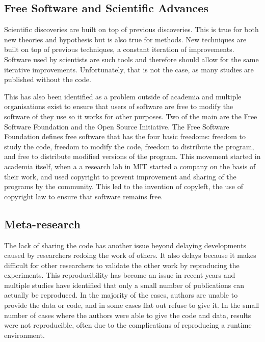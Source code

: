   \subsection{Free Software and Scientific Advances}
  Scientific discoveries are built on top of previous discoveries.
  This is true for both new theories and hypothesis but is also true
  for methods.  New techniques are built on top of previous
  techniques, a constant iteration of improvements.  Software used by
  scientists are such tools and therefore should allow for the same
  iterative improvements.  Unfortunately, that is not the case, as
  many studies are published without the code.

  This has also been identified as a problem outside of academia and
  multiple organisations exist to ensure that users of software are
  free to modify the software of they use so it works for other
  purposes.  Two of the main are the Free Software Foundation and the
  Open Source Initiative.  The Free Software Foundation defines free
  software that has the four basic freedoms: freedom to study the
  code, freedom to modify the code, freedom to distribute the program,
  and free to distribute modified versions of the program.  This
  movement started in academia itself, when a a research lab in MIT
  started a company on the basis of their work, and used copyright to
  prevent improvement and sharing of the programs by the community.
  This led to the invention of copyleft, the use of copyright law to
  ensure that software remains free.

  \subsection{Meta-research}

  The lack of sharing the code has another issue beyond delaying
  developments caused by researchers redoing the work of others.  It
  also delays because it makes difficult for other researchers to
  validate the other work by reproducing the experiments.  This
  reproducibility has become an issue in recent years and multiple
  studies have identified that only a small number of publications can
  actually be reproduced.  In the majority of the cases, authors are
  unable to provide the data or code, and in some cases flat out
  refuse to give it.  In the small number of cases where the authors
  were able to give the code and data, results were not reproducible,
  often due to the complications of reproducing a runtime environment.

